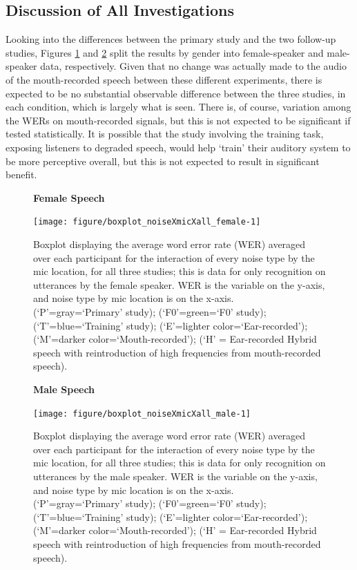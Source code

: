 \subsection{Discussion of All Investigations}
\label{chap3:glob_discussion}

Looking into the differences between the primary study and the two follow-up studies, Figures \ref{fig:female-all} and \ref{fig:male-all} split the results by gender into female-speaker and male-speaker data, respectively.  Given that no change was actually made to the audio of the mouth-recorded speech between these different experiments, there is expected to be no substantial observable difference between the three studies, in each condition, which is largely what is seen.  There is, of course, variation among the WERs on mouth-recorded signals, but this is not expected to be significant if tested statistically.  It is possible that the study involving the training task, exposing listeners to degraded speech, would help `train' their auditory system to be more perceptive overall, but this is not expected to result in significant benefit.




\begin{figure}[h!]
\centering
\textbf{Female Speech}

\texttt{[image: figure/boxplot\_noiseXmicXall\_female-1]} 

\caption{Boxplot displaying the average word error rate (WER) averaged over each participant for the interaction of every noise type by the mic location, for all three studies; this is data for only recognition on utterances by the female speaker. WER is the variable on the y-axis, and noise type by mic location is on the x-axis. (`P'=gray=`Primary' study); (`F0'=green=`F0' study); (`T'=blue=`Training' study); (`E'=lighter color=`Ear-recorded'); (`M'=darker color=`Mouth-recorded'); (`H' = Ear-recorded Hybrid speech with reintroduction of high frequencies from mouth-recorded speech).}
\label{fig:female-all}
\end{figure}

\begin{figure}[h!]
\centering
\textbf{Male Speech}

\texttt{[image: figure/boxplot\_noiseXmicXall\_male-1]} 

\caption{Boxplot displaying the average word error rate (WER) averaged over each participant for the interaction of every noise type by the mic location, for all three studies; this is data for only recognition on utterances by the male speaker. WER is the variable on the y-axis, and noise type by mic location is on the x-axis. (`P'=gray=`Primary' study); (`F0'=green=`F0' study); (`T'=blue=`Training' study); (`E'=lighter color=`Ear-recorded'); (`M'=darker color=`Mouth-recorded'); (`H' = Ear-recorded Hybrid speech with reintroduction of high frequencies from mouth-recorded speech).}
\label{fig:male-all}
\end{figure}


